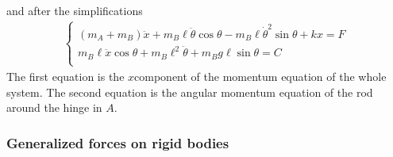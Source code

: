 \documentclass[letterpaper,10pt,english]{jupyterBook}
\begin{document}
\sphinxAtStartPar
and after the simplifications
\begin{equation*}
\begin{split}\begin{cases}
  \left( m_A + m_B \right) \ddot{x} + m_B \ell \ddot{\theta} \cos \theta - m_B \ell \dot{\theta}^2 \sin \theta + k x = F \\ 
  m_B \ell \ddot{x} \cos \theta + m_B \ell^2 \ddot{\theta} + m_B g \ell \sin \theta = C \\ 
\end{cases}\end{split}
\end{equation*}
\sphinxAtStartPar
{} The first equation is the \(x\)\sphinxhyphen{}component of the momentum equation of the whole system. The second equation is the angular momentum equation of the rod around the hinge in \(A\).
\subsubsection*{Generalized forces on rigid bodies}
\end{document}
